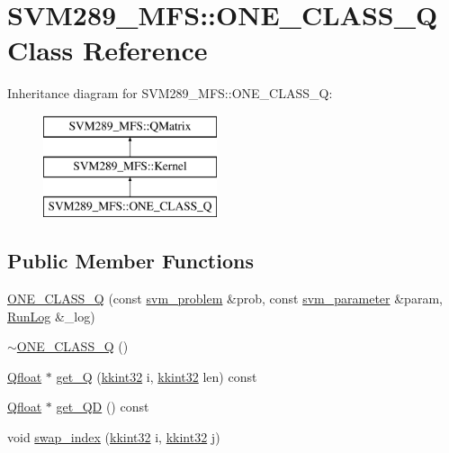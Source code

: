 \hypertarget{class_s_v_m289___m_f_s_1_1_o_n_e___c_l_a_s_s___q}{}\section{S\+V\+M289\+\_\+\+M\+FS\+:\+:O\+N\+E\+\_\+\+C\+L\+A\+S\+S\+\_\+Q Class Reference}
\label{class_s_v_m289___m_f_s_1_1_o_n_e___c_l_a_s_s___q}
Inheritance diagram for S\+V\+M289\+\_\+\+M\+FS\+:\+:O\+N\+E\+\_\+\+C\+L\+A\+S\+S\+\_\+Q\+:\begin{figure}[H]
\begin{center}
\leavevmode
\includegraphics[height=3.000000cm]{class_s_v_m289___m_f_s_1_1_o_n_e___c_l_a_s_s___q}
\end{center}
\end{figure}
\subsection*{Public Member Functions}
\begin{DoxyCompactItemize}
\item 
\hyperlink{class_s_v_m289___m_f_s_1_1_o_n_e___c_l_a_s_s___q_a81763e539e10ea0d4e5d4e2cec33ab24}{O\+N\+E\+\_\+\+C\+L\+A\+S\+S\+\_\+Q} (const \hyperlink{struct_s_v_m289___m_f_s_1_1svm__problem}{svm\+\_\+problem} \&prob, const \hyperlink{struct_s_v_m289___m_f_s_1_1svm__parameter}{svm\+\_\+parameter} \&param, \hyperlink{class_k_k_b_1_1_run_log}{Run\+Log} \&\+\_\+log)
\item 
\hyperlink{class_s_v_m289___m_f_s_1_1_o_n_e___c_l_a_s_s___q_a3fe8b51e1de8f3a73a701689205c58e2}{$\sim$\+O\+N\+E\+\_\+\+C\+L\+A\+S\+S\+\_\+Q} ()
\item 
\hyperlink{namespace_s_v_m289___m_f_s_a440663a1b8d42bc10329401883645ae1}{Qfloat} $\ast$ \hyperlink{class_s_v_m289___m_f_s_1_1_o_n_e___c_l_a_s_s___q_a7a95b1341361fb4df58e1e383c700f9b}{get\+\_\+Q} (\hyperlink{namespace_k_k_b_a8fa4952cc84fda1de4bec1fbdd8d5b1b}{kkint32} i, \hyperlink{namespace_k_k_b_a8fa4952cc84fda1de4bec1fbdd8d5b1b}{kkint32} len) const 
\item 
\hyperlink{namespace_s_v_m289___m_f_s_a440663a1b8d42bc10329401883645ae1}{Qfloat} $\ast$ \hyperlink{class_s_v_m289___m_f_s_1_1_o_n_e___c_l_a_s_s___q_a386c218c99d23240f12e7086dce66a48}{get\+\_\+\+QD} () const 
\item 
void \hyperlink{class_s_v_m289___m_f_s_1_1_o_n_e___c_l_a_s_s___q_a00459667791988a61c0e84cb06c4c6b3}{swap\+\_\+index} (\hyperlink{namespace_k_k_b_a8fa4952cc84fda1de4bec1fbdd8d5b1b}{kkint32} i, \hyperlink{namespace_k_k_b_a8fa4952cc84fda1de4bec1fbdd8d5b1b}{kkint32} j)
\end{DoxyCompactItemize}
